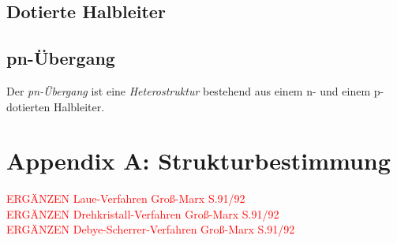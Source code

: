 \documentclass{article}
\begin{document}
\newpage


\subsection{Dotierte Halbleiter}


\newpage


\subsection{pn-Übergang}
Der \textit{pn-Übergang} ist eine \textit{Heterostruktur} bestehend aus einem n- und einem p-dotierten Halbleiter.


\newpage


%
%
%


\newpage


\section{Appendix A: Strukturbestimmung}
\textcolor{red}{ERGÄNZEN Laue-Verfahren Groß-Marx S.91/92}\\
\textcolor{red}{ERGÄNZEN Drehkristall-Verfahren Groß-Marx S.91/92}\\
\textcolor{red}{ERGÄNZEN Debye-Scherrer-Verfahren Groß-Marx S.91/92}
\end{document}
